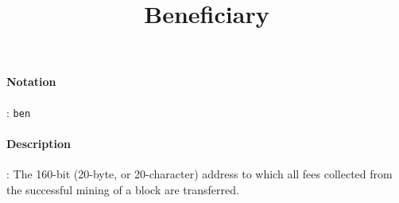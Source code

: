 \documentclass[10pt,a4paper,oneside]{scrartcl}
\author{}
\title{Beneficiary}
\date{}
\begin{document}
\maketitle
\paragraph{Notation}: \texttt{ben}
\paragraph{Description}: The 160-bit (20-byte, or 20-character) address to which all fees collected from the successful mining of a block are transferred.  
\end{document}
